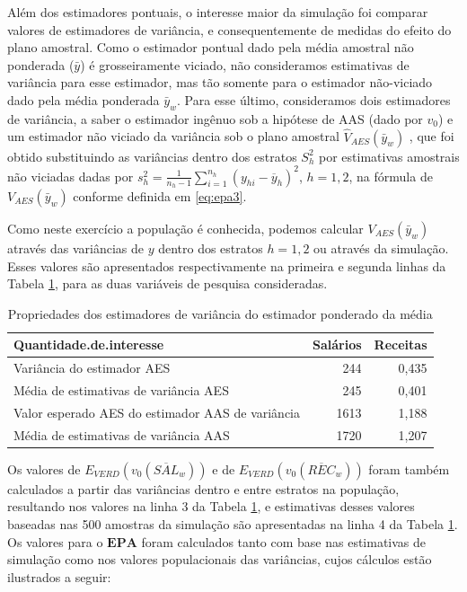 \documentclass[]{book}
\theoremstyle{definition}
\theoremstyle{definition}
\theoremstyle{definition}
\theoremstyle{remark}
\begin{document}
Além dos estimadores pontuais, o interesse maior da simulação foi
comparar valores de estimadores de variância, e consequentemente de
medidas do efeito do plano amostral. Como o estimador pontual dado pela
média amostral não ponderada (\(\bar{y}\)) é grosseiramente viciado, não
consideramos estimativas de variância para esse estimador, mas tão
somente para o estimador não-viciado dado pela média ponderada
\(\bar{y}_{w}\). Para esse último, consideramos dois estimadores de
variância, a saber o estimador ingênuo sob a hipótese de AAS (dado por
\(v_{0}\)) e um estimador não viciado da variância sob o plano amostral
\(\hat{V}_{AES}\left( \bar{y}_{w}\right)\) , que foi obtido substituindo
as variâncias dentro dos estratos \(S_{h}^{2}\) por estimativas
amostrais não viciadas dadas por
\(s_{h}^{2}=\frac{1}{n_{h}-1}\sum_{i=1}^{n_{h}}(y_{hi}-\overline{y}_{h})^{2}\),
\(h=1,2\), na fórmula de \(V_{AES}\left( \bar{y}_{w}\right)\) conforme
definida em \eqref{eq:epa3}.

Como neste exercício a população é conhecida, podemos calcular
\(V_{AES}\left(\bar{y}_{w}\right)\) através das variâncias de \(y\)
dentro dos estratos \(h=1,2\) ou através da simulação. Esses valores são
apresentados respectivamente na primeira e segunda linhas da Tabela
\ref{tab:varest}, para as duas variáveis de pesquisa consideradas.

\begin{table}

\caption{\label{tab:varest}Propriedades dos estimadores de variância do estimador ponderado da média}
\centering
\begin{tabular}[t]{lrr}
\toprule
Quantidade.de.interesse & Salários & Receitas\\
\midrule
Variância do estimador AES & 244 & 0,435\\
Média de estimativas de variância AES & 245 & 0,401\\
Valor esperado AES do estimador AAS de variância & 1613 & 1,188\\
Média de estimativas de variância AAS & 1720 & 1,207\\
\bottomrule
\end{tabular}
\end{table}

Os valores de
\(E_{VERD}\left( v_{0}\left( \overline{SAL}_{w}\right) \right)\) e de
\(E_{VERD}\left( v_{0}\left( \overline{REC}_{w}\right) \right)\) foram
também calculados a partir das variâncias dentro e entre estratos na
população, resultando nos valores na linha 3 da Tabela \ref{tab:varest},
e estimativas desses valores baseadas nas 500 amostras da simulação são
apresentadas na linha 4 da Tabela \ref{tab:varest}. Os valores para o
\(\mathbf{EPA}\) foram calculados tanto com base nas estimativas de
simulação como nos valores populacionais das variâncias, cujos cálculos
estão ilustrados a seguir:
\end{document}
